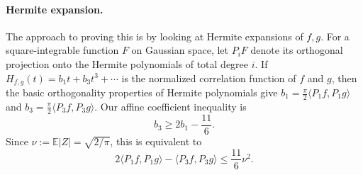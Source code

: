 








\paragraph{Hermite expansion.} The approach to proving this is by looking at Hermite expansions of $f, g$. For a square-integrable function \(F\) on Gaussian space, let \(P_iF\) denote its orthogonal projection onto the Hermite polynomials of total degree \(i\).  If
\(H_{f,g}(t)=b_1t+b_3t^3+\cdots\) is the normalized correlation function of \(f\) and \(g\), then the basic orthogonality properties of Hermite polynomials give
\(b_1=\frac{\pi}{2}\langle P_1f,P_1g\rangle\) and
\(b_3=\frac{\pi}{2}\langle P_3f,P_3g\rangle\).
Our affine coefficient inequality is
\begin{equation*}
    b_3\geq 2b_1-\frac{11}{6}.
\end{equation*}
Since \(\nu:=\mathbb E|Z|=\sqrt{2/\pi}\), this is equivalent to
\[
    2\langle P_1f,P_1g\rangle-\langle P_3f,P_3g\rangle
    \leq \frac{11}{6}\nu^2.
\]

